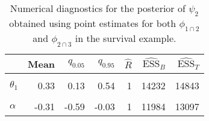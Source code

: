 \begin{table}

\caption{Numerical diagnostics for the posterior of $\psi_{2}$ obtained using point estimates for both $\phi_{1 \cap 2}$ and $\phi_{2 \cap 3}$ in the survival example.}
\centering
\begin{tabular}[t]{lrrrrrr}
\toprule
  & Mean & $q_{0.05}$ & $q_{0.95}$ & $\widehat{R}$ & $\widehat{\text{ESS}}_{B}$ & $\widehat{\text{ESS}}_{T}$\\
\midrule
\cellcolor{gray!6}{$\theta_{0}$} & \cellcolor{gray!6}{-0.10} & \cellcolor{gray!6}{-0.87} & \cellcolor{gray!6}{0.61} & \cellcolor{gray!6}{1} & \cellcolor{gray!6}{12857} & \cellcolor{gray!6}{12870}\\
$\theta_{1}$ & 0.33 & 0.13 & 0.54 & 1 & 14232 & 14843\\
\cellcolor{gray!6}{$\gamma$} & \cellcolor{gray!6}{11.95} & \cellcolor{gray!6}{10.31} & \cellcolor{gray!6}{13.61} & \cellcolor{gray!6}{1} & \cellcolor{gray!6}{16361} & \cellcolor{gray!6}{12862}\\
$\alpha$ & -0.31 & -0.59 & -0.03 & 1 & 11984 & 13097\\
\bottomrule
\end{tabular}
\end{table}